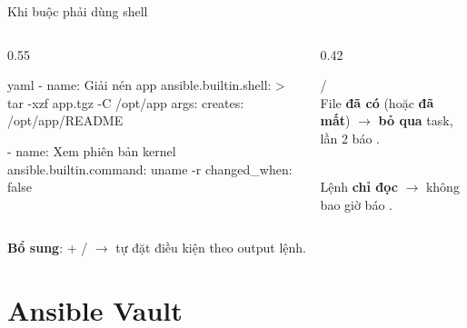 \documentclass[aspectratio=169,11pt,xcolor=table]{beamer}
\begin{document}
\begin{frame}[fragile]{Khi buộc phải dùng shell}
  \par\vspace{0.3cm}
  \begin{columns}[T]
    \begin{column}{0.55\textwidth}
\begin{codeblock}[minted options={fontsize=\scriptsize}]{yaml}
- name: Giải nén app
  ansible.builtin.shell: >
    tar -xzf app.tgz -C /opt/app
  args:
    creates: /opt/app/README

- name: Xem phiên bản kernel
  ansible.builtin.command: uname -r
  changed_when: false
\end{codeblock}
    \end{column}
    \begin{column}{0.42\textwidth}
      \raggedright
      \begin{fitnote}
         / \\
        File \textbf{đã có} (hoặc \textbf{đã mất}) $\rightarrow$ \textbf{bỏ qua} task,
        lần 2 báo .
      \end{fitnote}
      \vspace{0.2cm}
      \begin{fitnote}
        \\
        Lệnh \textbf{chỉ đọc} $\rightarrow$ không bao giờ báo .
      \end{fitnote}
    \end{column}
  \end{columns}
  \vspace{0.3cm}
  {\small \textbf{Bổ sung}:  + /
   $\rightarrow$ tự đặt điều kiện theo output lệnh.}
\end{frame}

\section{Ansible Vault}
\end{document}
